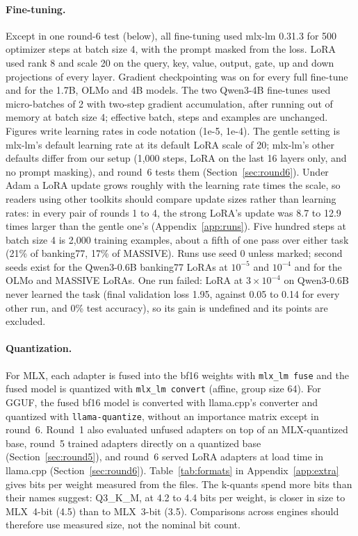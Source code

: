 \documentclass[10pt]{article}
\begin{document}
\paragraph{Fine-tuning.} Except in one round-6 test (below), all fine-tuning used mlx-lm 0.31.3 for 500 optimizer steps at batch size 4, with the prompt masked from the loss. LoRA used rank 8 and scale 20 on the query, key, value, output, gate, up and down projections of every layer. Gradient checkpointing was on for every full fine-tune and for the 1.7B, OLMo and 4B models. The two Qwen3-4B fine-tunes used micro-batches of 2 with two-step gradient accumulation, after running out of memory at batch size 4; effective batch, steps and examples are unchanged. Figures write learning rates in code notation (1e-5, 1e-4). The gentle setting is mlx-lm's default learning rate at its default LoRA scale of 20; mlx-lm's other defaults differ from our setup (1,000 steps, LoRA on the last 16 layers only, and no prompt masking), and round~6 tests them (Section~\ref{sec:round6}). Under Adam a LoRA update grows roughly with the learning rate times the scale, so readers using other toolkits should compare update sizes rather than learning rates: in every pair of rounds 1 to 4, the strong LoRA's update was 8.7 to 12.9 times larger than the gentle one's (Appendix~\ref{app:runs}). Five hundred steps at batch size 4 is 2,000 training examples, about a fifth of one pass over either task (21\% of banking77, 17\% of MASSIVE). Runs use seed 0 unless marked; second seeds exist for the Qwen3-0.6B banking77 LoRAs at $10^{-5}$ and $10^{-4}$ and for the OLMo and MASSIVE LoRAs. One run failed: LoRA at $3\times10^{-4}$ on Qwen3-0.6B never learned the task (final validation loss 1.95, against 0.05 to 0.14 for every other run, and 0\% test accuracy), so its gain is undefined and its points are excluded.

\paragraph{Quantization.} For MLX, each adapter is fused into the bf16 weights with \texttt{mlx\_lm fuse} and the fused model is quantized with \texttt{mlx\_lm convert} (affine, group size 64). For GGUF, the fused bf16 model is converted with llama.cpp's converter and quantized with \texttt{llama-quantize}, without an importance matrix except in round~6. Round~1 also evaluated unfused adapters on top of an MLX-quantized base, round~5 trained adapters directly on a quantized base (Section~\ref{sec:round5}), and round~6 served LoRA adapters at load time in llama.cpp (Section~\ref{sec:round6}). Table~\ref{tab:formats} in Appendix~\ref{app:extra} gives bits per weight measured from the files. The k-quants spend more bits than their names suggest: Q3\_K\_M, at 4.2 to 4.4 bits per weight, is closer in size to MLX~4-bit (4.5) than to MLX~3-bit (3.5). Comparisons across engines should therefore use measured size, not the nominal bit count.
\end{document}

